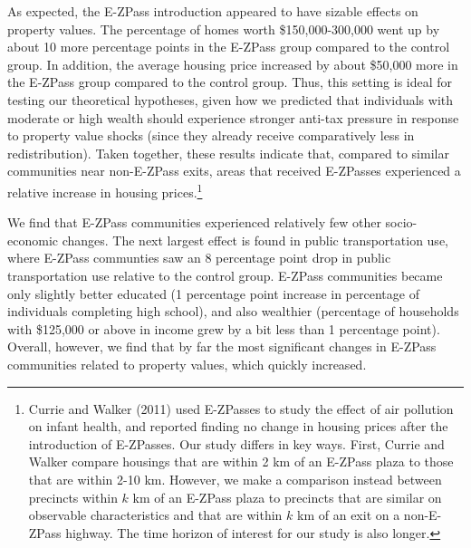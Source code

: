 \documentclass[11.0pt]{article}
\theoremstyle{definition}
\begin{document}
As expected, the E-ZPass introduction appeared to have sizable effects on property values. The percentage of homes worth \$150,000-300,000 went up by about 10 more percentage points in the E-ZPass group compared to the control group. In addition, the average housing price increased by about \$50,000 more in the E-ZPass group compared to the control group. Thus, this setting is ideal for testing our theoretical hypotheses, given how we predicted that individuals with moderate or high wealth should experience stronger anti-tax pressure in response to property value shocks (since they already receive comparatively less in redistribution). Taken together, these results indicate that, compared to similar communities near non-E-ZPass exits, areas that received E-ZPasses experienced a relative increase in housing prices.\footnote{Currie and Walker (2011) used E-ZPasses to study the effect of air pollution on infant health, and reported finding no change in housing prices after the introduction of E-ZPasses. Our study differs in key ways. First, Currie and Walker compare housings that are within 2 km of an E-ZPass plaza to those that are within 2-10 km. However, we make a comparison instead between precincts within $k$ km of an E-ZPass plaza to precincts that are similar on observable characteristics and that are within $k$ km of an exit on a non-E-ZPass highway. The time horizon of interest for our study is also longer.} 

We find that E-ZPass communities experienced relatively few other socio-economic changes. The next largest effect is found in public transportation use, where E-ZPass communties saw an 8 percentage point drop in public transportation use relative to the control group. E-ZPass communities became only slightly better educated (1 percentage point increase in percentage of individuals completing high school), and also wealthier (percentage of households with \$125,000 or above in income grew by a bit less than 1 percentage point). Overall, however, we find that by far the most significant changes in E-ZPass communities related to property values, which quickly increased. 
\end{document}
